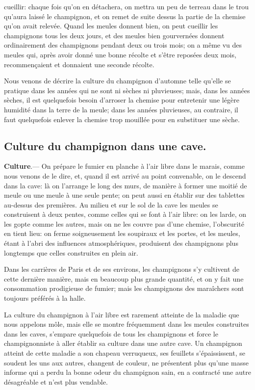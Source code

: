 \documentclass[10pt,a4paper]{book}
\begin{document}
cueillir: chaque fois qu'on en détachera, on mettra un peu de terreau dans le trou qu'aura laissé le champignon, et on remet de suite dessus la partie de la chemise qu'on avait relevée. Quand les meules donnent bien, on peut cueillir les champignons tous les deux jours, et des meules bien gourvernées donnent ordinairement des champignons pendant deux ou trois mois; on a même vu des meules qui, après avoir donné une bonne récolte et s'être reposées deux mois, recommençaient et donnaient une seconde récolte.

Nous venons de décrire la culture du champignon d'automne telle qu'elle se pratique dans les années qui ne sont ni sèches ni pluvieuses; mais, dans les années sèches, il est quelquefois besoin d'arroser la chemise pour entretenir une légère humidité dans la terre de la meule; dans les années pluvieuses, au contraire, il faut quelquefois enlever la chemise trop mouillée pour en substituer une sèche.

\subsection{Culture du champignon dans une cave.}

\textbf{Culture}.--- On prépare le fumier en planche à l'air libre dans le marais, comme nous venons de le dire, et, quand il est arrivé au point convenable, on le descend dans la cave: là on l'arrange le long des murs, de manière à former une moitié de meule ou une meule à une seule pente; on peut aussi en établir sur des tablettes au-dessus des premières. Au milieu et sur le sol de la cave les meules se construisent à deux pentes, comme celles qui se font à l'air libre: on les larde, on les gopte comme les autres, mais on ne les couvre pas d'une chemise, l'obscurité en tient lieu: on ferme soigneusement les soupiraux et les portes, et les meules, étant à l'abri des influences atmosphériques, produisent des champignons plus longtemps que celles construites en plein air.

Dans les carrières de Paris et de ses environs, les champignons s'y cultivent de cette dernière manière, mais en beaucoup plus grande quantité, et on y fait une consommation prodigieuse de fumier; mais les champignons des maraîchers sont toujours préférés à la halle.

La culture du champignon à l'air libre est rarement atteinte de la maladie que nous appelons môle, mais elle se montre fréquemment dans les meules construites dans les caves, s'empare quelquefois de tous les champignons et force le champignonniste à aller établir sa culture dans une autre cave. Un champignon atteint de cette maladie a son chapeau verruqueux, ses feuillets s'épaississent, se soudent les uns aux autres, changent de couleur, ne présentent plus qu'une masse informe qui a perdu la bonne odeur du champignon sain, en a contracté une autre désagréable et n'est plus vendable.
\end{document}

